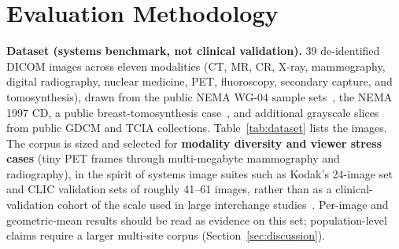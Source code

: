\documentclass[journal]{IEEEtran}
\begin{document}
\section{Evaluation Methodology}
\label{sec:methodology}

\textbf{Dataset (systems benchmark, not clinical validation).}
39 de-identified DICOM images across eleven modalities (CT, MR, CR, X-ray,
mammography, digital radiography, nuclear medicine, PET, fluoroscopy, secondary
capture, and tomosynthesis), drawn from the public NEMA WG-04 sample
sets~\cite{nema_wg04}, the NEMA 1997 CD, a public breast-tomosynthesis
case~\cite{clunie_tomo}, and additional grayscale slices from public GDCM and
TCIA collections. Table~\ref{tab:dataset} lists the images. The corpus is sized
and selected for \textbf{modality diversity and viewer stress cases} (tiny PET
frames through multi-megabyte mammography and radiography), in the spirit of
systems image suites such as Kodak's 24-image set and CLIC validation sets of
roughly 41--61 images, rather than as a clinical-validation cohort of the scale
used in large interchange studies~\cite{clunie2000}. Per-image and geometric-mean
results should be read as evidence on this set; population-level claims require
a larger multi-site corpus (Section~\ref{sec:discussion}).
\end{document}
